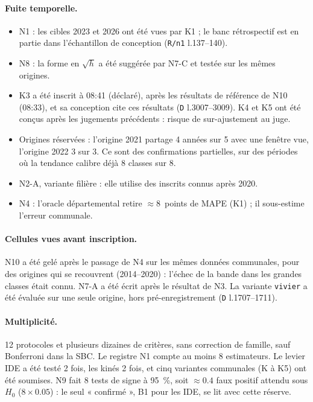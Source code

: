 \paragraph{Fuite temporelle.}
\begin{itemize}
  \item N1 : les cibles 2023 et 2026 ont été vues par K1 ; le banc rétrospectif est en partie dans
        l'échantillon de conception (\texttt{R/n1} l.137--140).
  \item N8 : la forme en $\sqrt h$ a été suggérée par N7-C et testée sur les mêmes origines.
  \item K3 a été inscrit à 08:41 (déclaré), après les résultats de référence de N10 (08:33\mesure),
        et sa conception cite ces résultats (\texttt{D} l.3007--3009). K4 et K5 ont été conçus
        après les jugements précédents : risque de sur-ajustement au juge.
  \item Origines réservées : l'origine 2021 partage 4\derive{} années sur 5 avec une fenêtre vue,
        l'origine 2022 3\derive{} sur 3. Ce sont des confirmations partielles, sur des périodes
        où la tendance calibre déjà 8\mesure{} classes sur 8.
  \item N2-A, variante filière : elle utilise des inscrits connus après 2020.
  \item N4 : l'oracle départemental retire $\approx 8$\mesure{}~points de MAPE (K1) ; il sous-estime
        l'erreur communale.
\end{itemize}

\paragraph{Cellules vues avant inscription.} N10 a été gelé après le passage de N4 sur les mêmes
données communales, pour des origines qui se recouvrent (2014--2020) : l'échec de la bande dans les
grandes classes était connu. N7-A a été écrit après le résultat de N3. La variante \texttt{vivier}
a été évaluée sur une seule origine, hors pré-enregistrement (\texttt{D} l.1707--1711).

\paragraph{Multiplicité.} 12\mesure{} protocoles et plusieurs dizaines de critères, sans
correction de famille, sauf Bonferroni dans la SBC. Le registre N1 compte au moins 8\mesure{}
estimateurs. Le levier IDE a été testé 2\mesure{} fois, les kinés 2\mesure{} fois, et cinq
variantes communales (K à K5) ont été soumises. N9 fait 8\mesure{} tests de signe à 95~\%, soit
$\approx \num{0.4}$\derive{} faux positif attendu sous $H_0$ ($8 \times \num{0.05}$) : le seul
« confirmé », B1 pour les IDE, se lit avec cette réserve.

